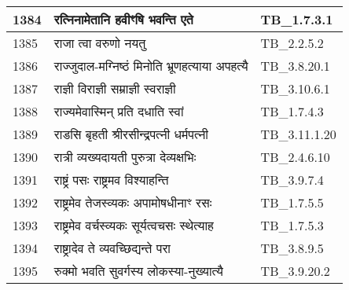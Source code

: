 \documentclass[17pt]{extarticle}
\begin{document}
\begin{longtable}{||p{0.4in}||p{4.9in}||p{0.9in}||}
    1384 & रत्निनामेतानि हवीꣳषि भवन्ति एते & TB\_1.7.3.1       \\
    
    \hline
        
    1385 & राजा त्वा वरुणो नयतु & TB\_2.2.5.2       \\
    
    \hline
        
    1386 & राज्जुदाल{-}मग्निष्ठं मिनोति भ्रूणहत्याया अपहत्यै & TB\_3.8.20.1       \\
    
    \hline
        
    1387 & राज्ञी विराज्ञी सम्राज्ञी स्वराज्ञी & TB\_3.10.6.1       \\
    
    \hline
        
    1388 & राज्यमेवास्मिन् प्रति दधाति स्वां & TB\_1.7.4.3       \\
    
    \hline
        
    1389 & राडसि बृहती श्रीरसीन्द्रपत्नी धर्मपत्नी & TB\_3.11.1.20       \\
    
    \hline
        
    1390 & रात्री व्यख्यदायती पुरुत्रा देव्यक्षभिः & TB\_2.4.6.10       \\
    
    \hline
        
    1391 & राष्ट्रं पसः राष्ट्रमव विश्याहन्ति & TB\_3.9.7.4       \\
    
    \hline
        
    1392 & राष्ट्रमेव तेजस्व्यकः अपामोषधीनाꣳ रसः & TB\_1.7.5.5       \\
    
    \hline
        
    1393 & राष्ट्रमेव वर्चस्व्यकः सूर्यत्वचसः स्थेत्याह & TB\_1.7.5.3       \\
    
    \hline
        
    1394 & राष्ट्रादेव ते व्यवच्छिद्यन्ते परा & TB\_3.8.9.5       \\
    
    \hline
        
    1395 & रुक्मो भवति सुवर्गस्य लोकस्या{-}नुख्यात्यै & TB\_3.9.20.2       \\
    
    \hline
        

\end{longtable}
\end{document}
